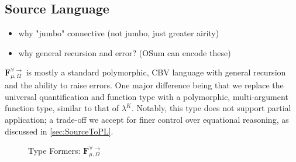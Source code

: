 \documentclass[acmsmall]{acmart}
\newcommand{\source}{$\mathbf{F}_{\mu,\Omega}^{\forall\to}\;$}
\begin{document}
\subsection{Source Language}\label{sec:SourceLang}
\begin{itemize}
  \item why "jumbo" connective (not jumbo, just greater airity)
  \item why general recursion and error? (OSum can encode these)
\end{itemize}
\source is mostly a standard polymorphic, CBV language with general recursion and the ability to raise errors. One major difference being that we replace the universal quantification and function type with a polymorphic, multi-argument function type, similar to that of $\lambda^K$\cite{SysFtoTAL}. Notably, this type does not support partial application; a trade-off we accept for finer control over equational reasoning, as discussed in \cref{sec:SourceToPL}.

\begin{figure}[H]
  \caption{Type Formers: \source}
  \label{fig:value-type-formers}
\end{figure}
\end{document}
